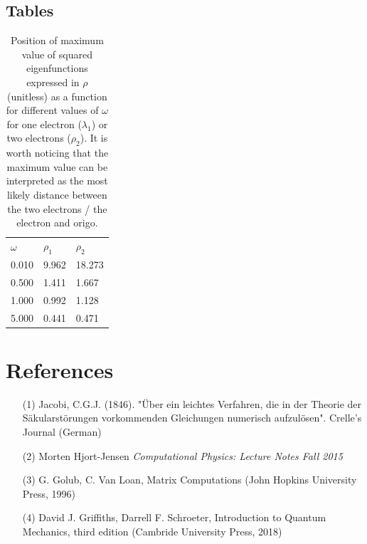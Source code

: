 \documentclass[10pt,a4paper]{article}
\begin{document}
\subsection{Tables}
\begin{table}[H]
\caption[Maximum value of eigenfunctions$^2$]{Position of maximum value of squared eigenfunctions expressed in $\rho$ (unitless) as a function for different values of $\omega$ for one electron ($\lambda_1$) or two electrons ($\rho_2$). It is worth noticing that the maximum value can be interpreted as the most likely distance between the two electrons / the electron and origo.}
\begin{tabular}{lll}
$\omega$ &$\rho_1$ & $\rho_2$  \\
0.010 & 9.962 & 18.273 \\
0.500 &1.411 & 1.667 \\
1.000 &0.992 & 1.128  \\
5.000 &0.441 & 0.471\\
\end{tabular}
\end{table}

\section{References}
\begin{itemize}
\item[(1)] Jacobi, C.G.J. (1846). "Über ein leichtes Verfahren, die in der Theorie der Säkularstörungen vorkommenden Gleichungen numerisch aufzulösen". Crelle's Journal (German)
\item[(2)] Morten Hjort-Jensen \textit{Computational Physics: Lecture Notes Fall 2015}
\item[(3)]G. Golub, C. Van Loan, Matrix Computations (John Hopkins University Press, 1996)
\item[(4)]David J. Griffiths, Darrell F. Schroeter, Introduction to Quantum Mechanics, third edition (Cambride University Press, 2018)
\end{itemize}

\end{document}
